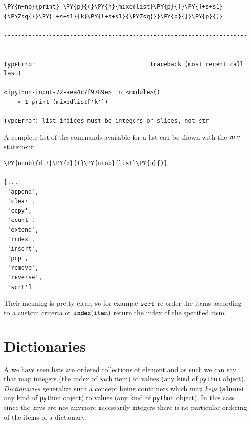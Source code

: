 \begin{tcolorbox}[breakable, size=fbox, boxrule=1pt, pad at break*=1mm, colback=cellbackground, colframe=cellborder]
\begin{Verbatim}[commandchars=\\\{\}]
\PY{n+nb}{print} \PY{p}{(}\PY{n}{mixedlist}\PY{p}{[}\PY{l+s+s1}{\PYZsq{}}\PY{l+s+s1}{k}\PY{l+s+s1}{\PYZsq{}}\PY{p}{]}\PY{p}{)}

---------------------------------------------------------------------------

TypeError                                 Traceback (most recent call last)

<ipython-input-72-aea4c7f9789e> in <module>()
----> 1 print (mixedlist['k'])
    
TypeError: list indices must be integers or slices, not str
\end{Verbatim}
\end{tcolorbox}

A complete list of the commands available for a list can be shown with the $\tt{dir}$ statement:

\begin{tcolorbox}[breakable, size=fbox, boxrule=1pt, pad at break*=1mm,colback=cellbackground, colframe=cellborder]
\begin{Verbatim}[commandchars=\\\{\}]
\PY{n+nb}{dir}\PY{p}{(}\PY{n+nb}{list}\PY{p}{)}

[...
 'append',
 'clear',
 'copy',
 'count',
 'extend',
 'index',
 'insert',
 'pop',
 'remove',
 'reverse',
 'sort']
\end{Verbatim}
\end{tcolorbox}

Their meaning is pretty clear, so for example $\tt{sort}$ re-order the items according to a custom criteria or $\tt{index(item)}$ return the index of the specified item.

\section{Dictionaries}\label{dictionaries}

A we have seen lists are ordered collections of element and as such we can say that map integers (the index of each item) to values (any kind of \texttt{python} object). \emph{Dictionaries} generalize such a concept being containers which map \emph{keys} (\textbf{almost} any kind of \texttt{python} object) to values (any kind of \texttt{python} object).
In this case since the keys are not anymore necessarily integers there is no particular ordering of the items of a dictionary.

